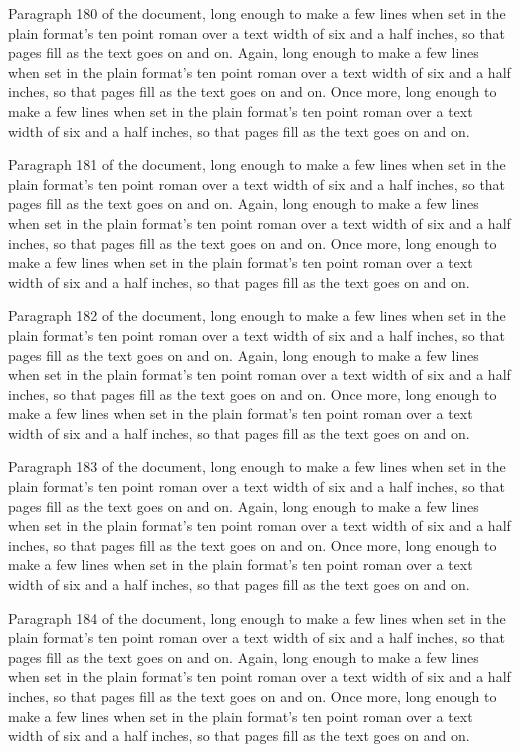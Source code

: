 Paragraph 180 of the document, long enough to make a few lines when set in the plain format's ten point roman over a text width of six and a half inches, so that pages fill as the text goes on and on. Again, long enough to make a few lines when set in the plain format's ten point roman over a text width of six and a half inches, so that pages fill as the text goes on and on. Once more, long enough to make a few lines when set in the plain format's ten point roman over a text width of six and a half inches, so that pages fill as the text goes on and on.

Paragraph 181 of the document, long enough to make a few lines when set in the plain format's ten point roman over a text width of six and a half inches, so that pages fill as the text goes on and on. Again, long enough to make a few lines when set in the plain format's ten point roman over a text width of six and a half inches, so that pages fill as the text goes on and on. Once more, long enough to make a few lines when set in the plain format's ten point roman over a text width of six and a half inches, so that pages fill as the text goes on and on.

Paragraph 182 of the document, long enough to make a few lines when set in the plain format's ten point roman over a text width of six and a half inches, so that pages fill as the text goes on and on. Again, long enough to make a few lines when set in the plain format's ten point roman over a text width of six and a half inches, so that pages fill as the text goes on and on. Once more, long enough to make a few lines when set in the plain format's ten point roman over a text width of six and a half inches, so that pages fill as the text goes on and on.

Paragraph 183 of the document, long enough to make a few lines when set in the plain format's ten point roman over a text width of six and a half inches, so that pages fill as the text goes on and on. Again, long enough to make a few lines when set in the plain format's ten point roman over a text width of six and a half inches, so that pages fill as the text goes on and on. Once more, long enough to make a few lines when set in the plain format's ten point roman over a text width of six and a half inches, so that pages fill as the text goes on and on.

Paragraph 184 of the document, long enough to make a few lines when set in the plain format's ten point roman over a text width of six and a half inches, so that pages fill as the text goes on and on. Again, long enough to make a few lines when set in the plain format's ten point roman over a text width of six and a half inches, so that pages fill as the text goes on and on. Once more, long enough to make a few lines when set in the plain format's ten point roman over a text width of six and a half inches, so that pages fill as the text goes on and on.

